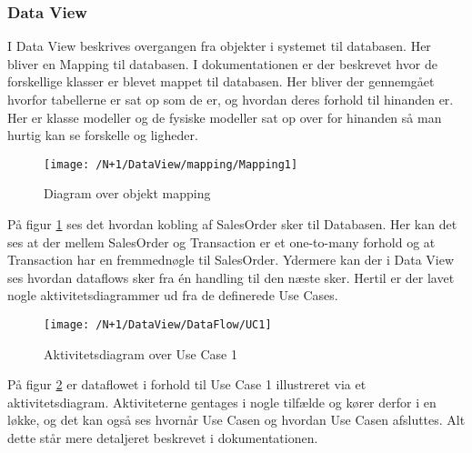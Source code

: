 \subsubsection{Data View}
I Data View beskrives overgangen fra objekter i systemet til databasen. Her bliver en Mapping til databasen.\newline\newline
I dokumentationen er der beskrevet hvor de forskellige klasser er blevet mappet til databasen. Her bliver der gennemgået hvorfor tabellerne er sat op som de er, og hvordan deres forhold til hinanden er. Her er klasse modeller og de fysiske modeller sat op over for hinanden så man hurtig kan se forskelle og ligheder.

\begin{figure}[H]
	\centering
	\texttt{[image: /N+1/DataView/mapping/Mapping1]}
	\caption{Diagram over objekt mapping}
	\label{MapDia}
\end{figure}	

På figur \ref{MapDia} ses det hvordan kobling af SalesOrder sker til Databasen. Her kan det ses at der mellem SalesOrder og Transaction er et one-to-many forhold og at Transaction har en fremmednøgle til SalesOrder.\newline\newline
Ydermere kan der i Data View ses hvordan dataflows sker fra én handling til den næste sker. Hertil er der lavet nogle aktivitetsdiagrammer ud fra de definerede Use Cases. 

\begin{figure}[H]
	\centering
	\texttt{[image: /N+1/DataView/DataFlow/UC1]}
	\caption{Aktivitetsdiagram over Use Case 1}	
	\label{AktDia}
\end{figure}

På figur \ref{AktDia} er dataflowet i forhold til Use Case 1 illustreret via et aktivitetsdiagram. Aktiviteterne gentages i nogle tilfælde og kører derfor i en løkke, og det kan også ses hvornår Use Casen og hvordan Use Casen afsluttes. Alt dette står mere detaljeret beskrevet i dokumentationen. 

 
 
  

